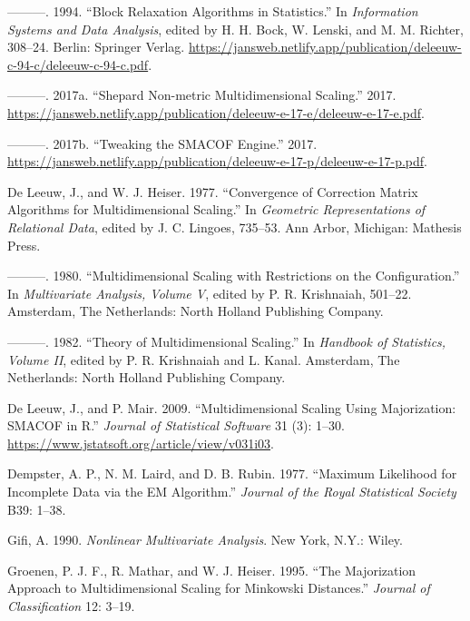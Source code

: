 \documentclass[
  12pt,
  letterpaper,
  DIV=11,
  numbers=noendperiod]{scrartcl}
\newlength{\cslhangindent}
\newenvironment{CSLReferences}[2] %
 {\begin{list}{}{%
  \setlength{\itemindent}{0pt}
  \setlength{\leftmargin}{0pt}
  \setlength{\parsep}{0pt}
  \ifodd #1
   \setlength{\leftmargin}{\cslhangindent}
   \setlength{\itemindent}{-1\cslhangindent}
  \fi
  \setlength{\itemsep}{#2\baselineskip}}}
 {\end{list}}
\begin{document}
\begin{CSLReferences}{1}{0}
---------. 1994. {``{Block Relaxation Algorithms in Statistics}.''} In
\emph{Information Systems and Data Analysis}, edited by H. H. Bock, W.
Lenski, and M. M. Richter, 308--24. Berlin: Springer Verlag.
\url{https://jansweb.netlify.app/publication/deleeuw-c-94-c/deleeuw-c-94-c.pdf}.

---------. 2017a. {``{Shepard Non-metric Multidimensional Scaling}.''}
2017.
\url{https://jansweb.netlify.app/publication/deleeuw-e-17-e/deleeuw-e-17-e.pdf}.

---------. 2017b. {``{Tweaking the SMACOF Engine}.''} 2017.
\url{https://jansweb.netlify.app/publication/deleeuw-e-17-p/deleeuw-e-17-p.pdf}.

De Leeuw, J., and W. J. Heiser. 1977. {``Convergence of Correction
Matrix Algorithms for Multidimensional Scaling.''} In \emph{Geometric
Representations of Relational Data}, edited by J. C. Lingoes, 735--53.
Ann Arbor, Michigan: Mathesis Press.

---------. 1980. {``Multidimensional Scaling with Restrictions on the
Configuration.''} In \emph{Multivariate Analysis, Volume {V}}, edited by
P. R. Krishnaiah, 501--22. Amsterdam, The Netherlands: North Holland
Publishing Company.

---------. 1982. {``Theory of Multidimensional Scaling.''} In
\emph{Handbook of Statistics, Volume {II}}, edited by P. R. Krishnaiah
and L. Kanal. Amsterdam, The Netherlands: North Holland Publishing
Company.

De Leeuw, J., and P. Mair. 2009. {``{Multidimensional Scaling Using
Majorization: SMACOF in R}.''} \emph{Journal of Statistical Software} 31
(3): 1--30. \url{https://www.jstatsoft.org/article/view/v031i03}.

Dempster, A. P., N. M. Laird, and D. B. Rubin. 1977. {``{Maximum
Likelihood for Incomplete Data via the EM Algorithm}.''} \emph{Journal
of the Royal Statistical Society} B39: 1--38.

Gifi, A. 1990. \emph{Nonlinear Multivariate Analysis}. New York, N.Y.:
Wiley.

Groenen, P. J. F., R. Mathar, and W. J. Heiser. 1995. {``{The
Majorization Approach to Multidimensional Scaling for Minkowski
Distances}.''} \emph{Journal of Classification} 12: 3--19.


\end{CSLReferences}
\end{document}
